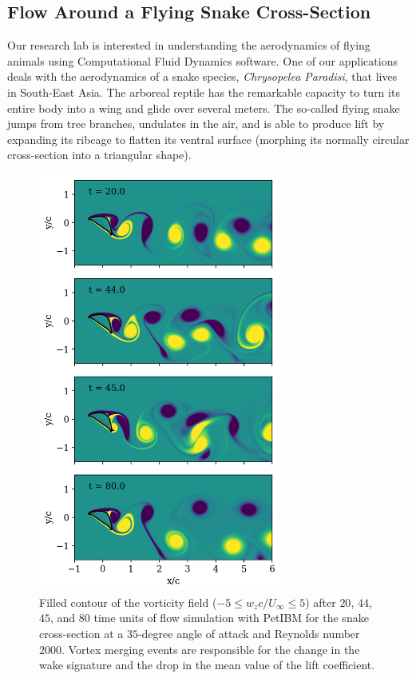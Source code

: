 \documentclass[10pt,journal,compsoc]{IEEEtran}
\begin{document}
\subsection{Flow Around a Flying Snake Cross-Section}\label{subsec:snake}

Our research lab is interested in understanding the aerodynamics of flying animals using Computational Fluid Dynamics software.
One of our applications deals with the aerodynamics of a snake species, \textit{Chrysopelea Paradisi}, that lives in South-East Asia.
The arboreal reptile has the remarkable capacity to turn its entire body into a wing and glide over several meters\cite{socha_2011}.
The so-called flying snake jumps from tree branches, undulates in the air, and is able to produce lift by expanding its ribcage to flatten its ventral surface (morphing its normally circular cross-section into a triangular shape).

\begin{figure}[!h]
    \centering
    \includegraphics[width=8cm]{figures/wz_multi_contourf.png}
    \caption{Filled contour of the vorticity field ($-5 \leq w_z c / U_\infty \leq 5$) after $20$, $44$, $45$, and $80$ time units of flow simulation with PetIBM for the snake cross-section at a $35$-degree angle of attack and Reynolds number $2000$. Vortex merging events are responsible for the change in the wake signature and the drop in the mean value of the lift coefficient.}
    \label{fig:wz_2d}
\end{figure}
\end{document}
